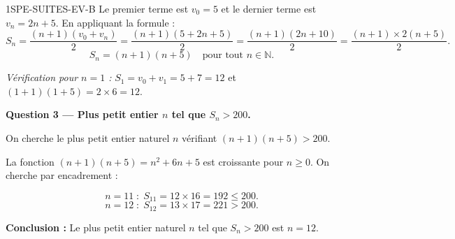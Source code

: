 \begin{corrige}{1SPE-SUITES-EV-B}
Le premier terme est $v_0 = 5$ et le dernier terme est $v_n = 2n + 5$. En appliquant la formule :
\[
  S_n = \frac{(n+1)(v_0 + v_n)}{2} = \frac{(n+1)(5 + 2n + 5)}{2} = \frac{(n+1)(2n+10)}{2} = \frac{(n+1) \times 2(n+5)}{2}.
\]
\[
  \boxed{S_n = (n+1)(n+5)} \quad \text{pour tout } n \in \mathbb{N}.
\]

\textit{Vérification pour $n = 1$ :} $S_1 = v_0 + v_1 = 5 + 7 = 12$ et $(1+1)(1+5) = 2 \times 6 = 12$. \checkmark

\medskip
\textbf{Question 3 — Plus petit entier $n$ tel que $S_n > 200$.}


On cherche le plus petit entier naturel $n$ vérifiant $(n+1)(n+5) > 200$.

La fonction $(n+1)(n+5) = n^2 + 6n + 5$ est croissante pour $n \geq 0$. On cherche par encadrement :

\[
  n = 11 \;:\; S_{11} = 12 \times 16 = 192 \leq 200.
\]
\[
  n = 12 \;:\; S_{12} = 13 \times 17 = 221 > 200.
\]

\textbf{Conclusion :} Le plus petit entier naturel $n$ tel que $S_n > 200$ est $\boxed{n = 12}$.

\end{corrige}

